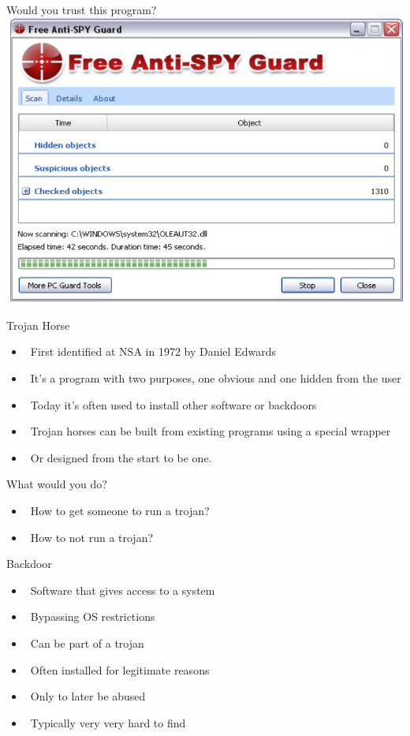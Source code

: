 \documentclass{beamer}
\begin{document}
\begin{frame}{Would you trust this program?}
  \includegraphics[width=0.8\linewidth]{freeantispy}
\end{frame}

\begin{frame}{Trojan Horse}
  \begin{itemize}
  \item  First identified at NSA in 1972 by Daniel 
    Edwards 
  \item  It's a program with two purposes, one obvious 
    and one hidden from the user 
  \item  Today it's often used to install other software or 
    backdoors 
  \item  Trojan horses can be built from existing 
    programs using a special wrapper 
  \item  Or designed from the start to be one.
  \end{itemize}
\end{frame}

\begin{frame}{What would you do?}
  \begin{itemize}
  \item  How to get someone to run a trojan? 
  \item  How to not run a trojan?
  \end{itemize}
\end{frame}

\begin{frame}{Backdoor}
  \begin{itemize}
  \item  Software that gives access to a system 
  \item  Bypassing OS restrictions 
  \item  Can be part of a trojan 
  \item  Often installed for legitimate reasons 
  \item  Only to later be abused 
  \item  Typically very very hard to find
  \end{itemize}
\end{frame}
\end{document}

